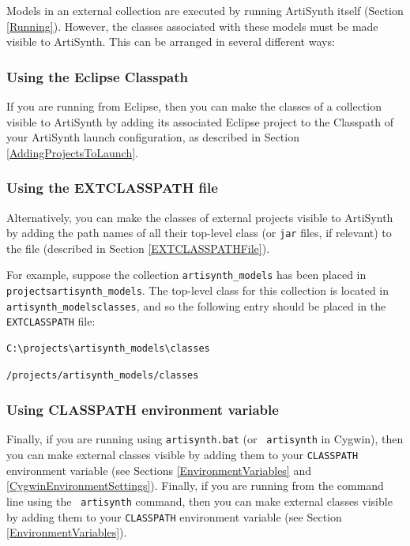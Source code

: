 Models in an external collection are executed by running ArtiSynth
itself (Section
\ref{Running}). However, the classes associated with these
models must be made visible to ArtiSynth. This can be
arranged in several different ways:

\subsubsection{Using the Eclipse Classpath}

If you are running from Eclipse, then you can make the classes of a
collection visible to ArtiSynth by adding its associated Eclipse
project to the {\sf Classpath} of your ArtiSynth launch configuration,
as described in Section \ref{AddingProjectsToLaunch}.

\subsubsection{Using the EXTCLASSPATH file}

Alternatively, you can make the classes of external projects visible
to ArtiSynth by adding the path names of all their top-level class
\directories{} (or {\tt jar} files, if relevant) to the file 
 (described in Section
\ref{EXTCLASSPATHFile}).

For example, suppose the collection {\tt artisynth\_models}
has been placed in {\tt \TOP projects\SEP artisynth\_models}.
The top-level class \directory{} for this collection is located
in {\tt artisynth\_models\SEP classes}, and so the following entry
should be placed in the {\tt EXTCLASSPATH} file:

\ifWindows
\begin{verbatim}
C:\projects\artisynth_models\classes
\end{verbatim}
\else %
\begin{verbatim}
/projects/artisynth_models/classes
\end{verbatim}
\fi %

\subsubsection{Using CLASSPATH environment variable}

\ifWindows
Finally, if you are running using {\tt artisynth.bat} (or {\tt
artisynth} in Cygwin), then you can make external classes visible by
adding them to your {\tt CLASSPATH} environment variable (see Sections
\ref{EnvironmentVariables} and \ref{CygwinEnvironmentSettings}).
\else %
Finally, if you are running from the command line using the {\tt
artisynth} command, then you can make external classes visible by adding
them to your {\tt CLASSPATH} environment variable (see Section
\ref{EnvironmentVariables}).
\fi %

